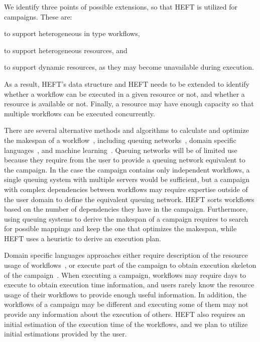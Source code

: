We identify three points of possible extensions, so that HEFT is utilized for campaigns.
These are:
\begin{inparaenum}[(i)]
    \item to support heterogeneous in type workflows,
    \item to support heterogeneous resources, and
    \item to support dynamic resources, as they may become unavailable during execution.
\end{inparaenum}
As a result, HEFT's data structure and HEFT needs to be extended to identify whether a workflow can be executed in a given resource or not, and whether a resource is available or not.
Finally, a resource may have enough capacity so that multiple workflows can be executed concurrently.

There are several alternative methods and algorithms to calculate and optimize the makespan of a workflow~\cite{lu2019review}, including queuing networks~\cite{yao2019throughput,bao2019performance}, domain specific languages~\cite{carothers2017durango,maheshwari2016workflow}, and machine learning~\cite{witt2019predictive,pumma2017runtime}.
Queuing networks will be of limited use because they require from the user to provide a queuing network equivalent to the campaign.
In the case the campaign contains only independent workflows, a single queuing system with multiple servers would be sufficient, but a campaign with complex dependencies between workflows may require expertise outside of the user domain to define the equivalent queuing network.
HEFT sorts workflows based on the number of dependencies they have in the campaign.
Furthermore, using queuing systems to derive the makespan of a campaign requires to search for possible mappings and keep the one that optimizes the makespan, while HEFT uses a heuristic to derive an execution plan.

Domain specific languages approaches either require description of the resource usage of workflows~\cite{carothers2017durango}, or execute part of the campaign to obtain execution skeleton of the campaign~\cite{maheshwari2016workflow}.
When executing a campaign, workflows may require days to execute to obtain execution time information, and users rarely know the resource usage of their workflows to provide enough useful information.
In addition, the workflows of a campaign may be different and executing some of them may not provide any information about the execution of others.
HEFT also requires an initial estimation of the execution time of the workflows, and we plan to utilize initial estimations provided by the user.

